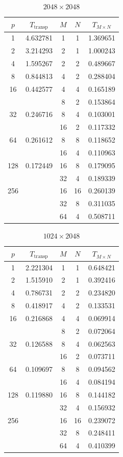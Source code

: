 \documentclass[a4paper,11pt]{article}
\begin{document}
\begin{minipage}{6.5cm}
\begin{table}[H]
\begin{tabular}{|cc|ccc|}
\hline
$p$ & $T_\text{transp}$ & $M$ & $N$ & $ T_{M \times N}$ \\ \hline
1 & 4.632781 & 1 & 1 & 1.369651 \\ \hline
2 & 3.214293 & 2 & 1 & 1.000243\\ \hline
4 & 1.595267 & 2 & 2 & 0.489667 \\ \hline
8 & 0.844813 & 4 & 2 & 0.288404 \\ \hline
16 & 0.442577 & 4 & 4 & 0.165189 \\
 & & 8 & 2 & 0.153864 \\ \hline
32 & 0.246716 & 8 & 4 & 0.103001 \\
& & 16 & 2 & 0.117332 \\ \hline
64 & 0.261612 & 8 & 8 & 0.118652 \\
& & 16 & 4 & 0.110963 \\ \hline
128 & 0.172449 & 16 & 8 & 0.179095 \\
& & 32 & 4 & 0.189339 \\ \hline
256 & & 16 & 16 & 0.260139 \\
& & 32 & 8 & 0.311035 \\
& & 64 & 4 & 0.508711 \\ \hline
\end{tabular}
\caption{$2048 \times 2048$} \label{tab:2048}
\end{table}
\end{minipage}
\begin{minipage}{6.5cm}
\begin{table}[H]
\begin{tabular}{|cc|ccc|}
\hline
$p$ & $T_\text{transp}$ & $M$ & $N$ & $ T_{M \times N}$ \\ \hline
1 & 2.221304 & 1 & 1 & 0.648421 \\ \hline
2 & 1.515910 & 2 & 1 & 0.392416 \\ \hline
4 & 0.786731 & 2 & 2 & 0.234820 \\ \hline
8 & 0.418917 & 4 & 2 & 0.133531 \\ \hline
16 & 0.216868 & 4 & 4 & 0.069914 \\
 & & 8 & 2 & 0.072064 \\ \hline
32 & 0.126588 & 8 & 4 & 0.062563 \\
& & 16 & 2 & 0.073711 \\ \hline
64 & 0.109697 & 8 & 8 & 0.094562 \\
& & 16 & 4 & 0.084194 \\ \hline
128 & 0.119880 & 16 & 8 & 0.144182 \\
& & 32 & 4 & 0.156932 \\ \hline
256 & & 16 & 16 & 0.239072 \\
& & 32 & 8 & 0.248411 \\
& & 64 & 4 & 0.410399 \\ \hline
\end{tabular}
\caption{$1024 \times 2048$} \label{tab:1024x2048}
\end{table}
\end{minipage}
\end{document}
